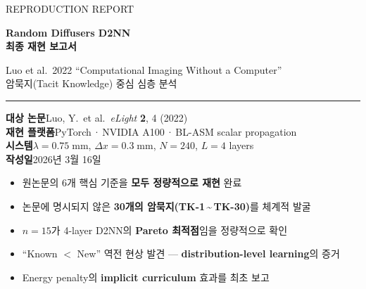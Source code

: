 \documentclass[11pt, a4paper]{article}
\begin{document}
\thispagestyle{empty}

\begin{center}
\vspace*{2cm}

{\sffamily\color{NatGray}\large REPRODUCTION REPORT}

\vspace{0.8cm}

{\sffamily\Huge\bfseries\color{NatBlue}
Random Diffusers D2NN\\[0.3em]
최종 재현 보고서}

\vspace{0.6cm}

{\sffamily\Large\color{NatBlue!70!black}
Luo et al.\ 2022 ``Computational Imaging Without a Computer''\\
암묵지(Tacit Knowledge) 중심 심층 분석}

\vspace{1.5cm}

\textcolor{BoxBorder}{\rule{0.6\textwidth}{0.8pt}}

\vspace{1cm}

{\large
\textbf{대상 논문}\quad Luo, Y.\ et al.\ \textit{eLight} \textbf{2}, 4 (2022)\\[0.5em]
\textbf{재현 플랫폼}\quad PyTorch\,·\,NVIDIA A100\,·\,BL-ASM scalar propagation\\[0.5em]
\textbf{시스템}\quad $\lambda = 0.75\;\text{mm}$,\; $\Delta x = 0.3\;\text{mm}$,\; $N = 240$,\; $L = 4$ layers\\[0.5em]
\textbf{작성일}\quad 2026년 3월 16일
}

\vspace{2cm}

\begin{insightbox}[핵심 요약]
\begin{itemize}
  \item 원논문의 6개 핵심 기준을 \textbf{모두 정량적으로 재현} 완료
  \item 논문에 명시되지 않은 \textbf{30개의 암묵지(TK-1\,\textasciitilde\,TK-30)}를 체계적 발굴
  \item $n = 15$가 4-layer D2NN의 \textbf{Pareto 최적점}임을 정량적으로 확인
  \item ``Known $<$ New'' 역전 현상 발견 --- \textbf{distribution-level learning}의 증거
  \item Energy penalty의 \textbf{implicit curriculum} 효과를 최초 보고
\end{itemize}
\end{insightbox}

\end{center}
\end{document}
